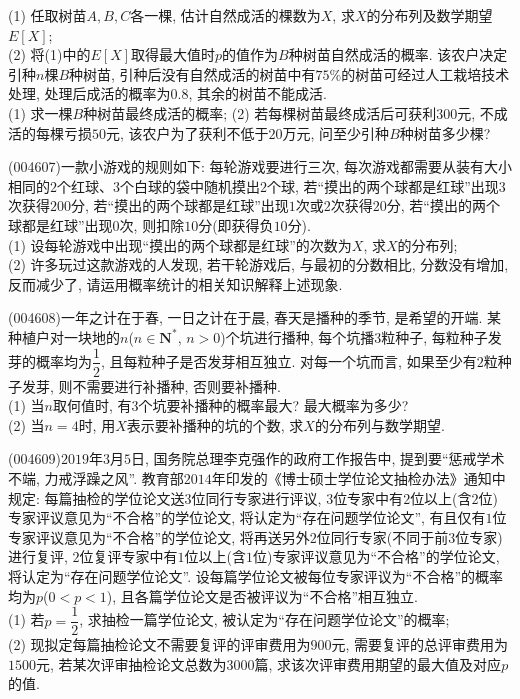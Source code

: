 (1) 任取树苗$A,B,C$各一棵, 估计自然成活的棵数为$X$, 求$X$的分布列及数学期望$E[X]$;\\
(2) 将(1)中的$E[X]$取得最大值时$p$的值作为$B$种树苗自然成活的概率. 该农户决定引种$n$棵$B$种树苗, 引种后没有自然成活的树苗中有$75\%$的树苗可经过人工栽培技术处理, 处理后成活的概率为$0.8$, 其余的树苗不能成活.\\
(1) 求一棵$B$种树苗最终成活的概率;
(2) 若每棵树苗最终成活后可获利$300$元, 不成活的每棵亏损$50$元, 该农户为了获利不低于$20$万元, 问至少引种$B$种树苗多少棵?
\item (004607)一款小游戏的规则如下: 每轮游戏要进行三次, 每次游戏都需要从装有大小相同的$2$个红球、$3$个白球的袋中随机摸出$2$个球, 若``摸出的两个球都是红球''出现$3$次获得$200$分, 若``摸出的两个球都是红球''出现$1$次或$2$次获得$20$分, 若``摸出的两个球都是红球''出现$0$次, 则扣除$10$分(即获得负$10$分).\\
(1) 设每轮游戏中出现``摸出的两个球都是红球''的次数为$X$, 求$X$的分布列;\\
(2) 许多玩过这款游戏的人发现, 若干轮游戏后, 与最初的分数相比, 分数没有增加, 反而减少了, 请运用概率统计的相关知识解释上述现象.
\item (004608)一年之计在于春, 一日之计在于晨, 春天是播种的季节, 是希望的开端. 某种植户对一块地的$n$($n\in \mathbf{N}^*$, $n>0$)个坑进行播种, 每个坑播$3$粒种子, 每粒种子发芽的概率均为$\dfrac 12$, 且每粒种子是否发芽相互独立. 对每一个坑而言, 如果至少有$2$粒种子发芽, 则不需要进行补播种, 否则要补播种.\\
(1) 当$n$取何值时, 有$3$个坑要补播种的概率最大? 最大概率为多少?\\
(2) 当$n=4$时, 用$X$表示要补播种的坑的个数, 求$X$的分布列与数学期望.
\item (004609)$2019$年$3$月$5$日, 国务院总理李克强作的政府工作报告中, 提到要``惩戒学术不端, 力戒浮躁之风''. 教育部$2014$年印发的《博士硕士学位论文抽检办法》通知中规定: 每篇抽检的学位论文送$3$位同行专家进行评议, $3$位专家中有$2$位以上(含$2$位)专家评议意见为``不合格''的学位论文, 将认定为``存在问题学位论文'', 有且仅有$1$位专家评议意见为``不合格''的学位论文, 将再送另外$2$位同行专家(不同于前$3$位专家)进行复评, $2$位复评专家中有$1$位以上(含$1$位)专家评议意见为``不合格''的学位论文, 将认定为``存在问题学位论文''. 设每篇学位论文被每位专家评议为``不合格''的概率均为$p$($0<p<1$), 且各篇学位论文是否被评议为``不合格''相互独立.\\
(1) 若$p=\dfrac 12$, 求抽检一篇学位论文, 被认定为``存在问题学位论文''的概率;\\
(2) 现拟定每篇抽检论文不需要复评的评审费用为$900$元, 需要复评的总评审费用为$1500$元, 若某次评审抽检论文总数为$3000$篇, 求该次评审费用期望的最大值及对应$p$的值.
